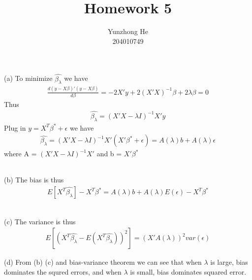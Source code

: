 \documentclass[12pt]{article}
\newenvironment{problem}[2][Problem]{\begin{trivlist}
\item[\hskip \labelsep {\bfseries #1}\hskip \labelsep {\bfseries #2}]}{\end{trivlist}}
\begin{document}
 
 
\title{Homework 5}%
\author{Yunzhong He\\ %
204010749} %
 
\maketitle
 
\begin{problem}{1. Bias-Variance Tradeoff}
\def \yy {X^T\hat{\beta_\lambda}}
\def \ys {X^T\beta^*}

\item{(a)}
To minimize $\hat{\beta_\lambda}$ we have
\begin{align*}
	\frac{d (y-X\beta)'(y-X\beta)}{d \beta} = -2X'y + 2(X'X)^{-1}\beta + 2\lambda\beta = 0
\end{align*}
Thus
\begin{align*}
	\hat{\beta_\lambda} = (X'X - \lambda I)^{-1}X'y
\end{align*}
Plug in $y = \ys + \epsilon$ we have
\begin{align*}
	\hat{\beta_\lambda} = (X'X - \lambda I)^{-1}X'(X'\beta^* + \epsilon) = A(\lambda)b + A(\lambda)\epsilon
\end{align*}
where A = $(X'X - \lambda I)^{-1}X'$ and b = $X'\beta^*$
\\\\
\item{(b)} The bias is thus
\begin{align*}
	E[\yy] - \ys = A(\lambda)b + A(\lambda)E(\epsilon) - \ys
\end{align*}
\\
\item{(c)} The variance is thus
\begin{align*}
	E[(\yy - E(\yy))^2] = (X'A(\lambda))^2 var(\epsilon)
\end{align*}
\item{(d)} From (b) (c) and bias-variance theorem we can see that when $\lambda$ is large, bias dominates the squred errors, and when $\lambda$ is small, bias dominates squared error. 
\end{problem}
\end{document}
